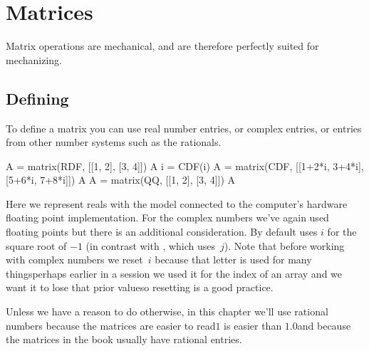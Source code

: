 \chapter{Matrices}

Matrix operations are mechanical, and are therefore perfectly suited for 
mechanizing.



\section{Defining}
To define a matrix 
you can use real number entries, or complex entries, or 
entries from other number systems such as the rationals. 
\begin{sageoutput}
A = matrix(RDF, [[1, 2], [3, 4]])
A
i = CDF(i)
A = matrix(CDF, [[1+2*i, 3+4*i], [5+6*i, 7+8*i]])
A
A = matrix(QQ, [[1, 2], [3, 4]])
A                               
\end{sageoutput}
\noindent
Here we represent reals with the model connected to the computer's hardware
floating point implementation. 
For the complex
numbers we've again 
used floating points but there is an additional consideration.
By default \Sage{} uses $i$ for the square root of $-1$ (in contrast with 
\python, which uses~$j$).
Note that before working with complex numbers we reset~$i$ 
because that letter is used for many things\Dash perhaps earlier in 
a session we used it for the index of an array and we want it to lose that
prior value\Dash so 
resetting is a good practice.

Unless we have a reason to do otherwise, in this chapter
we'll use rational numbers because the matrices are easier to 
read\Dash $1$ is easier than $1.0$\Dash and 
because the matrices in the book usually have rational entries.

